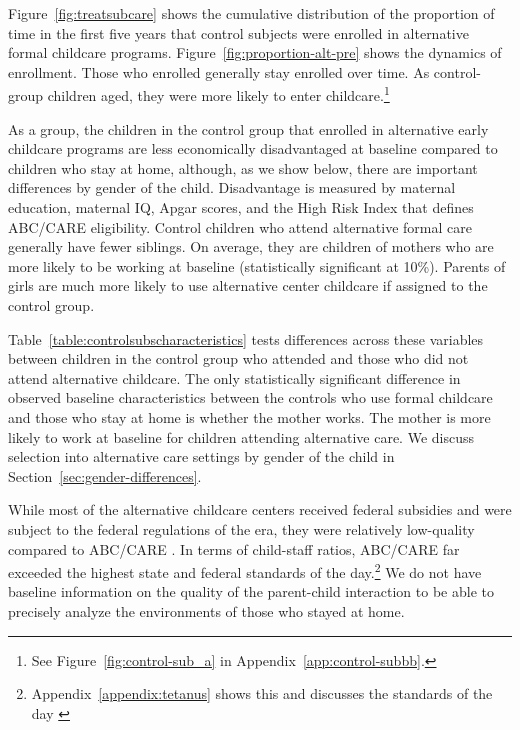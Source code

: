 Figure~\ref{fig:treatsubcare} shows the cumulative distribution of the proportion of time in the first five years that control subjects were enrolled in alternative formal childcare programs. Figure~\ref{fig:proportion-alt-pre} shows the dynamics of enrollment. Those who enrolled generally stay enrolled over time. As control-group children aged, they were more likely to enter childcare.\footnote{See Figure~\ref{fig:control-sub_a} in Appendix~\ref{app:control-subbb}.}

As a group, the children in the control group that enrolled in alternative early childcare programs are less economically disadvantaged at baseline compared to children who stay at home, although, as we show below, there are important differences by gender of the child. Disadvantage is measured by maternal education, maternal IQ, Apgar scores, and the High Risk Index that defines ABC/CARE eligibility. Control children who attend alternative formal care generally have fewer siblings. On average, they are children of mothers who are more likely to be working at baseline (statistically significant at 10\%). Parents of girls are much more likely to use alternative center childcare if assigned to the control group.

Table~\ref{table:controlsubscharacteristics} tests differences across these variables between children in the control group who attended and those who did not attend alternative childcare. The only statistically significant difference in observed baseline characteristics between the controls who use formal childcare and those who stay at home is whether the mother works. The mother is more likely to work at baseline for children attending alternative care. We discuss selection into alternative care settings by gender of the child in Section~\ref{sec:gender-differences}.

While most of the alternative childcare centers received federal subsidies and were subject to the federal regulations of the era, they were relatively low-quality compared to ABC/CARE \citep{Burchinal_etal_1989_CD_Daycare-Pre-K-Dev}. In terms of child-staff ratios, ABC/CARE far exceeded the highest state and federal standards of the day.\footnote{Appendix~\ref{appendix:tetanus} shows this and discusses the standards of the day \citep{Department-of-Health_1968_DayCareRequirements,NCGA_1971_House-Bill-100,Ramey-et-al_1977_Intro-to-ABC,Ramey_Campbell_1979_SR,Ramey_McGinness_etal_1982_Abecedarianapproach,Burchinal_Campbell_etal_1997_CD}} We do not have baseline information on the quality of the parent-child interaction to be able to precisely analyze the environments of those who stayed at home.

